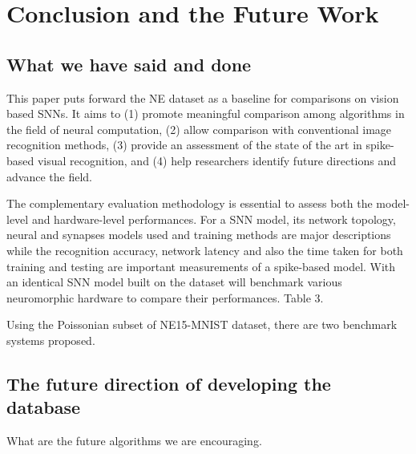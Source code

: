 \section{Conclusion and the Future Work}
\label{sec:summ}
\subsection{What we have said and done}
%
%

This paper puts forward the NE dataset as a baseline for comparisons on vision based SNNs.
It aims to (1) promote meaningful comparison among algorithms in the field of neural computation, (2) allow comparison with conventional image recognition methods, (3) provide an assessment of the state of the art in spike-based visual recognition, and (4) help researchers identify future directions and advance the field.

The complementary evaluation methodology is essential to assess both the model-level and hardware-level performances.
For a SNN model, its network topology, neural and synapses models used and training methods are major descriptions while the recognition accuracy, network latency and also the time taken for both training and testing are important measurements of a spike-based model.
With an identical SNN model built on the dataset will benchmark various neuromorphic hardware to compare their performances.
Table 3.

Using the Poissonian subset of NE15-MNIST dataset, there are two benchmark systems proposed. 

\subsection{The future direction of developing the database}
What are the future algorithms we are encouraging.

